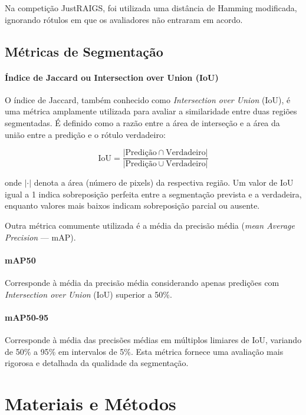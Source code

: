 \documentclass[12pt]{article}
\begin{document}
Na competição JustRAIGS, foi utilizada uma distância de Hamming modificada, ignorando rótulos em que os avaliadores não entraram em acordo.


\subsection{Métricas de Segmentação}
\label{sec:metrics_segmentation}

\paragraph{Índice de Jaccard ou Intersection over Union (IoU)}
O índice de Jaccard, também conhecido como \emph{Intersection over Union} (IoU), é uma métrica amplamente utilizada para avaliar a similaridade entre duas regiões segmentadas. É definido como a razão entre a área de interseção e a área da união entre a predição e o rótulo verdadeiro:

\begin{equation}
\text{IoU} = \frac{|\text{Predição} \cap \text{Verdadeiro}|}{|\text{Predição} \cup \text{Verdadeiro}|}
\end{equation}

onde \( |\cdot| \) denota a área (número de pixels) da respectiva região. Um valor de IoU igual a 1 indica sobreposição perfeita entre a segmentação prevista e a verdadeira, enquanto valores mais baixos indicam sobreposição parcial ou ausente.

Outra métrica comumente utilizada é a média da precisão média (\emph{mean Average Precision} --- mAP).

\paragraph{mAP50} Corresponde à média da precisão média considerando apenas predições com \emph{Intersection over Union} (IoU) superior a 50\%.

\paragraph{mAP50-95}  
Corresponde à média das precisões médias em múltiplos limiares de IoU, variando de 50\% a 95\% em intervalos de 5\%. Esta métrica fornece uma avaliação mais rigorosa e detalhada da qualidade da segmentação.


\section{Materiais e Métodos}
\label{sec:methodology}
\end{document}
